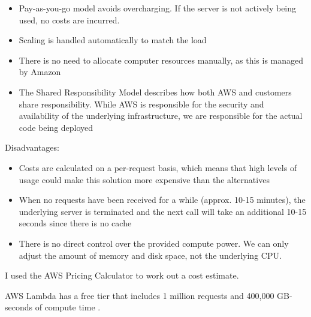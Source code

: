 \begin{itemize}
\item Pay-as-you-go model avoids overcharging. If the server is not actively being used, no costs are incurred.
\item Scaling is handled automatically to match the load
\item There is no need to allocate computer resources manually, as this is managed by Amazon
\item The Shared Responsibility Model describes how both AWS and customers share responsibility. While AWS is responsible for the security and availability of the underlying infrastructure, we are responsible for the actual code being deployed \cite{amazon-web-services-inc-2022B}
\end{itemize}


Disadvantages:

\begin{itemize}
\item Costs are calculated on a per-request basis, which means that high levels of usage could make this solution more expensive than the alternatives
\item When no requests have been received for a while (approx. 10-15 minutes), the underlying server is terminated and the next call will take an additional 10-15 seconds since there is no cache
\item There is no direct control over the provided compute power. We can only adjust the amount of memory and disk space, not the underlying CPU.
\end{itemize}

I used the AWS Pricing Calculator \cite{amazon-web-services-inc-2022C} to work out a cost estimate.

AWS Lambda has a free tier that includes 1 million requests and 400,000 GB-seconds of compute time \cite{amazon-web-services-inc-2022A}.

